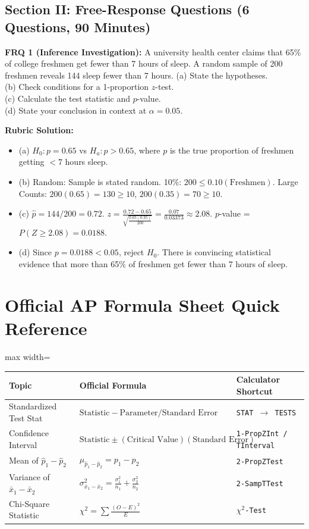 ﻿\documentclass[11pt,oneside,openany]{book}
\begin{document}
\section*{Section II: Free-Response Questions (6 Questions, 90 Minutes)}
\textbf{FRQ 1 (Inference Investigation):} A university health center claims that 65\% of college freshmen get fewer than 7 hours of sleep. A random sample of 200 freshmen reveals 144 sleep fewer than 7 hours.
(a) State the hypotheses.\\
(b) Check conditions for a 1-proportion $z$-test.\\
(c) Calculate the test statistic and $p$-value.\\
(d) State your conclusion in context at $\alpha = 0.05$.

\textbf{Rubric Solution:}
\begin{itemize}[leftmargin=1.2em]
  \item (a) $H_0: p = 0.65$ vs $H_a: p > 0.65$, where $p$ is the true proportion of freshmen getting $<7$ hours sleep.
  \item (b) Random: Sample is stated random. 10\%: $200 \le 0.10(\text{Freshmen})$. Large Counts: $200(0.65) = 130 \ge 10$, $200(0.35) = 70 \ge 10$.
  \item (c) $\hat{p} = 144/200 = 0.72$. $z = \frac{0.72 - 0.65}{\sqrt{\frac{0.65(0.35)}{200}}} = \frac{0.07}{0.03373} \approx 2.08$. $p$-value = $P(Z \ge 2.08) = 0.0188$.
  \item (d) Since $p = 0.0188 < 0.05$, reject $H_0$. There is convincing statistical evidence that more than 65\% of freshmen get fewer than 7 hours of sleep.
\end{itemize}

\backmatter
\chapter*{Official AP Formula Sheet Quick Reference}
\begin{adjustbox}{max width=\linewidth}
\begin{tabular}{lll}
\toprule
\textbf{Topic} & \textbf{Official Formula} & \textbf{Calculator Shortcut} \\
\midrule
Standardized Test Stat & $\text{Statistic} - \text{Parameter} / \text{Standard Error}$ & \texttt{STAT $\rightarrow$ TESTS} \\
Confidence Interval & $\text{Statistic} \pm (\text{Critical Value})(\text{Standard Error})$ & \texttt{1-PropZInt / TInterval} \\
Mean of $\hat{p}_1 - \hat{p}_2$ & $\mu_{\hat{p}_1 - \hat{p}_2} = p_1 - p_2$ & \texttt{2-PropZTest} \\
Variance of $\bar{x}_1 - \bar{x}_2$ & $\sigma^2_{\bar{x}_1 - \bar{x}_2} = \frac{\sigma_1^2}{n_1} + \frac{\sigma_2^2}{n_2}$ & \texttt{2-SampTTest} \\
Chi-Square Statistic & $\chi^2 = \sum \frac{(O-E)^2}{E}$ & \texttt{$\chi^2$-Test} \\
\bottomrule
\end{tabular}
\end{adjustbox}
\end{document}
